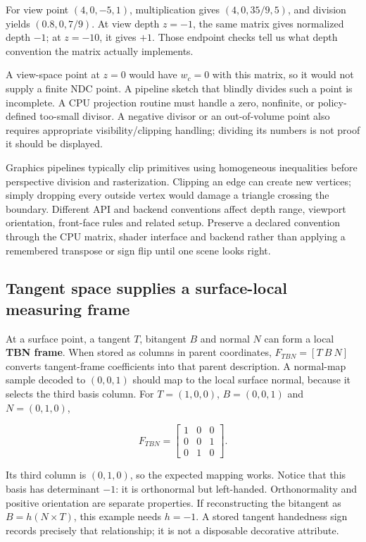 For view point \((4,0,-5,1)\), multiplication gives \((4,0,35/9,5)\), and division yields \((0.8,0,7/9)\). At view depth \(z=-1\), the same matrix gives normalized depth \(-1\); at \(z=-10\), it gives \(+1\). Those endpoint checks tell us what depth convention the matrix actually implements.

A view-space point at \(z=0\) would have \(w_c=0\) with this matrix, so it would not supply a finite NDC point. A pipeline sketch that blindly divides such a point is incomplete. A CPU projection routine must handle a zero, nonfinite, or policy-defined too-small divisor. A negative divisor or an out-of-volume point also requires appropriate visibility/clipping handling; dividing its numbers is not proof it should be displayed.

Graphics pipelines typically clip primitives using homogeneous inequalities before perspective division and rasterization. Clipping an edge can create new vertices; simply dropping every outside vertex would damage a triangle crossing the boundary. Different API and backend conventions affect depth range, viewport orientation, front-face rules and related setup. Preserve a declared convention through the CPU matrix, shader interface and backend rather than applying a remembered transpose or sign flip until one scene looks right.

\subsection{Tangent space supplies a surface-local measuring frame}\label{01-foundations-i-ch019-tangent-space-supplies-a-surface-local-measuring-frame}

\hypertarget{01-foundations-i-ch019-tangent-space-supplies-a-surface-local-measuring-frame}{}

At a surface point, a tangent \(T\), bitangent \(B\) and normal \(N\) can form a local \textbf{TBN frame}. When stored as columns in parent coordinates, \(F_{TBN}=[T\ B\ N]\) converts tangent-frame coefficients into that parent description. A normal-map sample decoded to \((0,0,1)\) should map to the local surface normal, because it selects the third basis column. For \(T=(1,0,0)\), \(B=(0,0,1)\) and \(N=(0,1,0)\),

\[
F_{TBN}=\begin{bmatrix}1&0&0\\0&0&1\\0&1&0\end{bmatrix}.
\]

Its third column is \((0,1,0)\), so the expected mapping works. Notice that this basis has determinant \(-1\): it is orthonormal but left-handed. Orthonormality and positive orientation are separate properties. If reconstructing the bitangent as \(B=h(N\times T)\), this example needs \(h=-1\). A stored tangent handedness sign records precisely that relationship; it is not a disposable decorative attribute.

